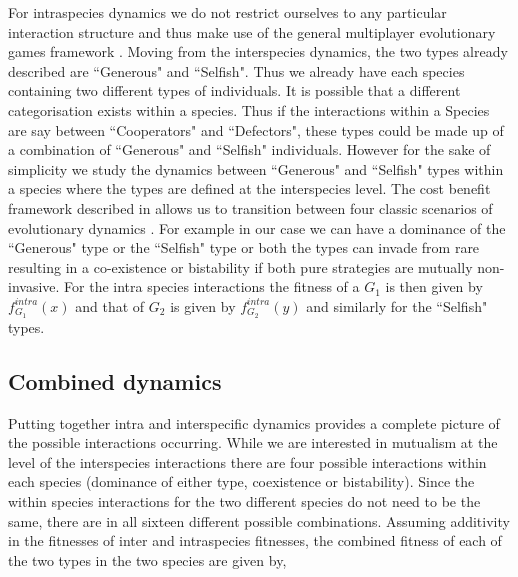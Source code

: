 \documentclass[12pt]{article}
\begin{document}
For intraspecies dynamics we do not restrict ourselves to any particular interaction structure and thus make use of the general multiplayer evolutionary games framework \citep{gokhale:PNAS:2010,gokhale:DGAA:2014}.
Moving from the interspecies dynamics, the two types already described are ``Generous" and ``Selfish".
Thus we already have each species containing two different types of individuals.
It is possible that a different categorisation exists within a species.
Thus if the interactions within a Species are say between ``Cooperators" and ``Defectors", these types could be made up of a combination of ``Generous" and ``Selfish" individuals.
However for the sake of simplicity we study the dynamics between ``Generous" and ``Selfish" types within a species where the types are defined at the interspecies level.
The cost benefit framework described in \citep{eshel:AmNat:1988,hauert:JTB:2006a}
 allows us to transition between four classic scenarios of evolutionary dynamics \citep{nowak:Science:2004}.
For example in our case we can have a dominance of the ``Generous" type or the ``Selfish" type or both the types can invade from rare resulting in a co-existence or bistability if both pure strategies are mutually non-invasive.
For the intra species interactions the fitness of a $G_1$ is then given by $f^{intra}_{G_1} (x)$ and that of $G_2$ is given by $f^{intra}_{G_2} (y)$ and similarly for the ``Selfish" types.

\subsection{Combined dynamics}

Putting together intra and interspecific dynamics provides a complete picture of the possible interactions occurring. While we are interested in mutualism at the level of the interspecies interactions there are four possible interactions within each species \citep{nowak:Science:2004,hauert:JTB:2006a} (dominance of either type, coexistence or bistability). Since the within species interactions for the two different species do not need to be the same, there are in all sixteen different possible combinations.
Assuming additivity in the fitnesses of inter and intraspecies fitnesses, the combined fitness of each of the two types in the two species are given by,
\end{document}
